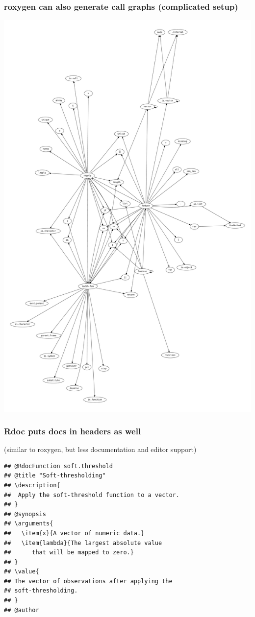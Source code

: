 \documentclass{beamer}
\begin{document}
\begin{frame}
  \frametitle{roxygen can also generate call graphs (complicated setup)}
  \includegraphics{Compose-callgraph}
\end{frame}

\begin{frame}[containsverbatim]
  \frametitle{Rdoc puts docs in headers as well}
  (similar to roxygen, but less documentation and editor support)
  \small
\begin{verbatim}
## @RdocFunction soft.threshold
## @title "Soft-thresholding"
## \description{
##  Apply the soft-threshold function to a vector.
## }
## @synopsis
## \arguments{
##   \item{x}{A vector of numeric data.}
##   \item{lambda}{The largest absolute value 
##      that will be mapped to zero.}
## }
## \value{
## The vector of observations after applying the
## soft-thresholding.
## }
## @author
\end{verbatim}
\end{frame}
\end{document}
